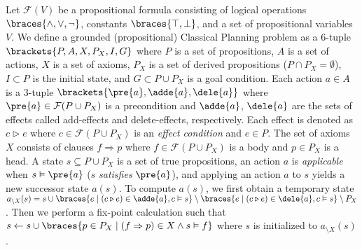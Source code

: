 Let $\mathcal{F}(V)$ be a propositional formula consisting of
 logical operations $\braces{\land,\lor,\lnot}$,
 constants $\braces{\top,\bot}$, and
 a set of propositional variables $V$.
We define a grounded (propositional) Classical Planning problem %
as a 6-tuple $\brackets{P,A,X,P_X,I,G}$
where
 $P$ is a set of propositions,
 $A$ is a set of actions,
 $X$ is a set of axioms,
 $P_X$ is a set of derived propositions ($P\cap P_X=\emptyset$),
 $I\subset P$ is the initial state, and
 $G\subset P\cup P_X$ is a goal condition.
Each action $a\in A$ is a 3-tuple $\brackets{\pre{a},\adde{a},\dele{a}}$ where
 $\pre{a} \in \mathcal{F}(P\cup P_X)$ is a precondition and
 $\adde{a}$, $\dele{a}$ are the sets of effects called add-effects and delete-effects, respectively.
Each effect is denoted as $c \triangleright e$ where
 $c \in \mathcal{F}(P\cup P_X)$ is an \emph{effect condition} and
 $e \in P$.
The set of axioms $X$ consists of clauses $f \Rightarrow p$ where
 $f \in \mathcal{F}(P\cup P_X)$ is a body and
 $p \in P_X$ is a head.
A state $s\subseteq P\cup P_X$ is a set of true propositions,
an action $a$ is \emph{applicable} when $s \vDash \pre{a}$ ($s$ \emph{satisfies} $\pre{a}$),
and applying an action $a$ to $s$ yields a new successor state $a(s)$.
To compute $a(s)$, we first obtain a temporary state
$a_{\setminus X}(s) = s
 \cup      \braces{e \mid (c \triangleright e) \in \adde{a}, c\vDash s}
 \setminus \braces{e \mid (c \triangleright e) \in \dele{a}, c\vDash s}
 \setminus P_X $.
Then we perform a fix-point calculation such that
$s \gets s \cup \braces{p \in P_X \mid (f\Rightarrow p)\in X \land s \vDash f}$
where $s$ is initialized to $a_{\setminus X}(s)$.
